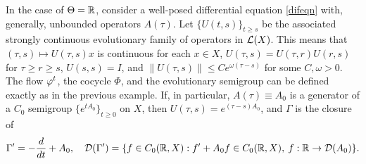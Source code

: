 \begin{exmp} 
In the case of $\Theta={\Bbb{R}}$, consider a well-posed differential equation
\eqref{difeqn} with, generally, unbounded operators $A(\tau)$.
Let  $\{U(t,s)\}_{t\ge s}$ be the associated
strongly continuous evolutionary family of
operators in ${\cal{L}}(X)$.  This means that
$(\tau,s)\mapsto U(\tau,s)x$ is continuous for each $x\in X$,
$U(\tau,s)=U(\tau,r)U(r,s)$  for $\tau\ge r\ge s$, $U(s,s)=I$, and
$\|U(\tau,s)\|\le C e^{\omega (\tau-s)}$ for some
$C,\omega>0$. The flow $\varphi^t$, the cocycle $\Phi$, and the
evolutionary semigroup can be defined exactly as in the previous
example. If, in particular, $A(\tau)\equiv A_0$ is a generator of a
$C_0$ semigroup $\{e^{tA_0}\}_{t\ge0}$ on $X$, then
$U(\tau,s)=e^{(\tau-s)A_0}$, and
$\Gamma$ is the closure of \[\Gamma'=-\dfrac{d}{dt}+A_0,\quad
{\cal{D}}(\Gamma')=\{f\in C_0({\Bbb{R}},X): f'+A_0f\in C_0({\Bbb{R}},X),\: f:{\Bbb{R}}\to{\cal{D}}(A_0)\}.\]


\end{exmp}
